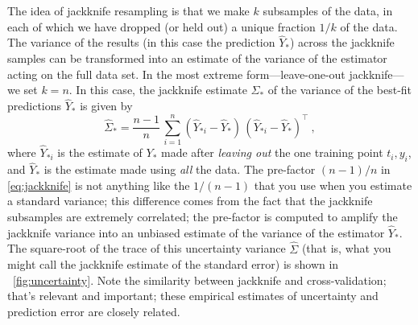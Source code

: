\documentclass[12pt,letterpaper]{article}
\begin{document}
The idea of jackknife resampling is that we make $k$ subsamples of the data, in each of which we have dropped (or held out) a unique fraction $1/k$ of the data.
The variance of the results (in this case the prediction $\hat{Y}_\ast$) across the jackknife samples can be transformed into an estimate of the variance of the estimator acting on the full data set.
In the most extreme form---leave-one-out jackknife---we set $k=n$.
In this case, the jackknife estimate $\hat{\Sigma}_\ast$ of the variance of the best-fit predictions $\hat{Y}_\ast$ is given by
\begin{equation}\label{eq:jackknife}
    \hat{\Sigma}_\ast = \frac{n-1}{n}\,\sum_{i=1}^n (\hat{Y}_{\ast i} - \hat{Y}_\ast)\,(\hat{Y}_{\ast i} - \hat{Y}_\ast)^\top
    ~,
\end{equation}
where $\hat{Y}_{\ast i}$ is the estimate of $Y_\ast$ made after \emph{leaving out} the one training point $t_i, y_i$, and $\hat{Y}_\ast$ is the estimate made using \emph{all} the data.
The pre-factor $(n-1)/n$ in \eqref{eq:jackknife} is not anything like the $1/(n-1)$ that you use when you estimate a standard variance; this difference comes from the fact that the jackknife subsamples are extremely correlated; the pre-factor is computed to amplify the jackknife variance into an unbiased estimate of the variance of the estimator $\hat{Y}_\ast$.
The square-root of the trace of this uncertainty variance $\hat{\Sigma}$ (that is, what you might call the jackknife estimate of the standard error) is shown in \figurename~\ref{fig:uncertainty}.
Note the similarity between jackknife and cross-validation; that's relevant and important; these empirical estimates of uncertainty and prediction error are closely related.
\end{document}
